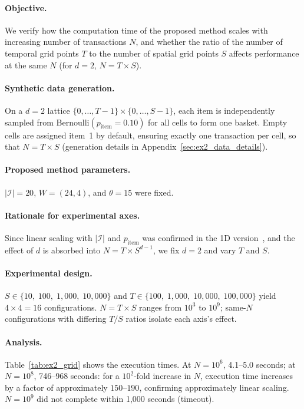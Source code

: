 \paragraph{Objective.}
We verify how the computation time of the proposed method
scales with increasing number of transactions $N$,
and whether the ratio of the number of temporal grid points $T$
to the number of spatial grid points $S$ affects performance
at the same $N$ (for $d=2$, $N = T \times S$).

\paragraph{Synthetic data generation.}
On a $d = 2$ lattice
$\{0,\ldots,T{-}1\} \times \{0,\ldots,S{-}1\}$,
each item is independently sampled from
Bernoulli$(p_{\mathrm{item}}{=}0.10)$
for all cells to form one basket.
Empty cells are assigned item~1 by default,
ensuring exactly one transaction per cell,
so that $N = T \times S$
(generation details in Appendix~\ref{sec:ex2_data_details}).

\paragraph{Proposed method parameters.}
$|\mathcal{I}| = 20$, $W = (24, 4)$, and $\theta = 15$ were fixed.

\paragraph{Rationale for experimental axes.}
Since linear scaling with $|\mathcal{I}|$ and $p_{\mathrm{item}}$ was confirmed
in the 1D version~\cite{aprioriwindow},
and the effect of $d$ is absorbed into $N = T \times S^{d-1}$,
we fix $d = 2$ and vary $T$ and $S$.

\paragraph{Experimental design.}
$S \in \{10,\; 100,\; 1{,}000,\; 10{,}000\}$ and
$T \in \{100,\; 1{,}000,\; 10{,}000,\; 100{,}000\}$
yield $4 \times 4 = 16$ configurations.
$N = T \times S$ ranges from $10^3$ to $10^9$;
same-$N$ configurations with differing $T/S$ ratios isolate each axis's effect.

\paragraph{Analysis.}
Table~\ref{tab:ex2_grid} shows the execution times.
At $N = 10^6$, 4.1--5.0 seconds; at $N = 10^8$, 746--968 seconds:
for a $10^2$-fold increase in $N$,
execution time increases by a factor of approximately $150$--$190$,
confirming approximately linear scaling.
$N = 10^9$ did not complete within 1{,}000 seconds (timeout).

